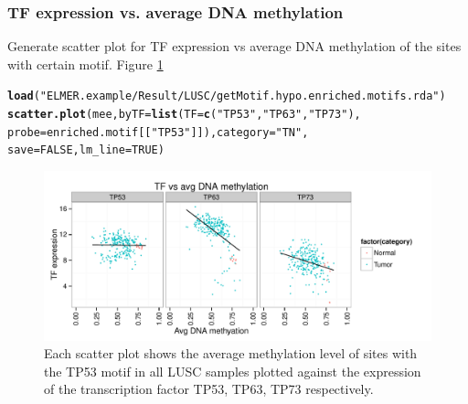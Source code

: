\documentclass{article}\usepackage[]{graphicx}\usepackage[]{color}
\makeatletter
\def\maxwidth{ %
  \ifdim\Gin@nat@width>\linewidth
    \linewidth
  \else
    \Gin@nat@width
  \fi
}
\newcommand{\hlnum}[1]{\textcolor[rgb]{0.686,0.059,0.569}{#1}}%
\newcommand{\hlstr}[1]{\textcolor[rgb]{0.192,0.494,0.8}{#1}}%
\newcommand{\hlstd}[1]{\textcolor[rgb]{0.345,0.345,0.345}{#1}}%
\newcommand{\hlkwc}[1]{\textcolor[rgb]{0.333,0.667,0.333}{#1}}%
\newcommand{\hlkwd}[1]{\textcolor[rgb]{0.737,0.353,0.396}{\textbf{#1}}}%
\newenvironment{kframe}{%
 \def\at@end@of@kframe{}%
 \ifinner\ifhmode%
  \def\at@end@of@kframe{\end{minipage}}%
  \begin{minipage}{\columnwidth}%
 \fi\fi%
 \def\FrameCommand##1{\hskip\@totalleftmargin \hskip-\fboxsep
 \colorbox{shadecolor}{##1}\hskip-\fboxsep
     \hskip-\linewidth \hskip-\@totalleftmargin \hskip\columnwidth}%
 \MakeFramed {\advance\hsize-\width
   \@totalleftmargin\z@ \linewidth\hsize
   \@setminipage}}%
 {\par\unskip\endMakeFramed%
 \at@end@of@kframe}
\newenvironment{knitrout}{}{} %
\makeatother
\begin{document}
\subsubsection{TF expression vs. average DNA methylation}
Generate scatter plot for TF expression vs average DNA methylation of the sites 
with certain motif. Figure \ref{fig:figure3}
\begin{knitrout}
\color{fgcolor}\begin{kframe}
\begin{alltt}
\hlkwd{load}\hlstd{(}\hlstr{"ELMER.example/Result/LUSC/getMotif.hypo.enriched.motifs.rda"}\hlstd{)}
\hlkwd{scatter.plot}\hlstd{(mee,}\hlkwc{byTF}\hlstd{=}\hlkwd{list}\hlstd{(}\hlkwc{TF}\hlstd{=}\hlkwd{c}\hlstd{(}\hlstr{"TP53"}\hlstd{,}\hlstr{"TP63"}\hlstd{,}\hlstr{"TP73"}\hlstd{),}
                           \hlkwc{probe}\hlstd{=enriched.motif[[}\hlstr{"TP53"}\hlstd{]]),} \hlkwc{category}\hlstd{=}\hlstr{"TN"}\hlstd{,}
             \hlkwc{save}\hlstd{=}\hlnum{FALSE}\hlstd{,} \hlkwc{lm_line}\hlstd{=}\hlnum{TRUE}\hlstd{)}
\end{alltt}
\end{kframe}\begin{figure}
\includegraphics[width=\maxwidth]{figure/figure3-1} \caption[TF expression vs. average DNA methylation]{\label{fig:TP53_TP63_TP73.byTF} Each scatter plot shows the average methylation level of sites with the TP53 motif in all LUSC samples plotted against the expression of the transcription factor TP53, TP63, TP73 respectively.}\label{fig:figure3}
\end{figure}


\end{knitrout}
\end{document}
